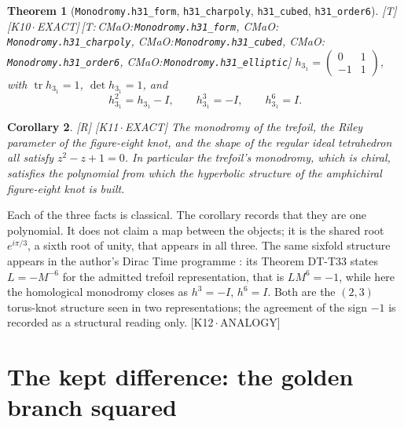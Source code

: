\documentclass[11pt]{article}
\newtheorem{theorem}{Theorem}
\newtheorem{corollary}[theorem]{Corollary}
\theoremstyle{definition}
\newcommand{\grade}[1]{\textsf{\small[#1]}}
\newcommand{\lean}[1]{\texttt{\small #1}}
\newcommand{\dtag}[1]{#1}
\begin{document}
\begin{theorem}[\lean{Monodromy.h31\_form}, \lean{h31\_charpoly}, \lean{h31\_cubed}, \lean{h31\_order6}]\grade{T}\dtag{ \textsf{\small[K10\,$\cdot$\,EXACT]}\,\textsf{\small[T:\,CMaO:\,\lean{Monodromy.\allowbreak{}h31\_\allowbreak{}form}, CMaO:\,\lean{Monodromy.\allowbreak{}h31\_\allowbreak{}charpoly}, CMaO:\,\lean{Monodromy.\allowbreak{}h31\_\allowbreak{}cubed}, CMaO:\,\lean{Monodromy.\allowbreak{}h31\_\allowbreak{}order6}, CMaO:\,\lean{Monodromy.\allowbreak{}h31\_\allowbreak{}elliptic}]}}
$h_{3_1}=\begin{pmatrix}0&1\\-1&1\end{pmatrix}$, with $\operatorname{tr}h_{3_1}=1$, $\det h_{3_1}=1$, and
\[ h_{3_1}^2=h_{3_1}-I,\qquad h_{3_1}^3=-I,\qquad h_{3_1}^6=I . \]
\end{theorem}

\begin{corollary}\grade{R}\dtag{ \textsf{\small[K11\,$\cdot$\,EXACT]}}
The monodromy of the trefoil, the Riley parameter of the figure-eight knot, and the shape of the regular ideal tetrahedron all satisfy $z^2-z+1=0$. In particular the trefoil's monodromy, which is chiral, satisfies the polynomial from which the hyperbolic structure of the amphichiral figure-eight knot is built.
\end{corollary}

Each of the three facts is classical. The corollary records that they are one polynomial. It does not claim a map between the objects; it is the shared root $e^{i\pi/3}$, a sixth root of unity, that appears in all three. The same sixfold structure appears in the author's Dirac Time programme \cite{DiracTime}: its Theorem DT-T33 states $L=-M^{-6}$ for the admitted trefoil representation, that is $LM^{6}=-1$, while here the homological monodromy closes as $h^3=-I$, $h^6=I$. Both are the $(2,3)$ torus-knot structure seen in two representations; the agreement of the sign $-1$ is recorded as a structural reading only.\dtag{ \textsf{\small[K12\,$\cdot$\,ANALOGY]}}

\section{The kept difference: the golden branch squared}
\end{document}
